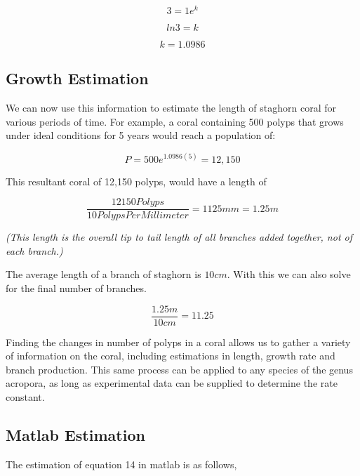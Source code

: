 \documentclass[12pt]{article}
\begin{document}
	\begin{equation}
		3=1e^{k}
	\end{equation}
	
	\begin{equation}
		ln3=k
	\end{equation}
	
	\begin{equation}
		k=1.0986
	\end{equation}
	
	\subsection{Growth Estimation}
	We can now use this information to estimate the length of staghorn coral for various periods of time.
	For example, a coral containing 500 polyps that grows under ideal conditions for 5 years would reach a population of:
	
	\begin{equation}
		P = 500e^{1.0986(5)} = 12,150
	\end{equation}
	
	This resultant coral of 12,150 polyps, would have a length of 
	
	\begin{equation}
		\frac{12150 Polyps}{10 Polyps Per Millimeter} =1125mm=1.25m
	\end{equation}
	
	\textit{(This length is the overall tip to tail length of all branches added together, not of each branch.) }
	
	The average length of a branch of staghorn is $10cm$\cite{AcroStats}. With this we can also solve for the final number of branches.
	
	\begin{equation}
		\frac{1.25m}{10cm}=11.25
	\end{equation}
	
	Finding the changes in number of polyps in a coral allows us to gather a variety of information on the coral, including estimations in length, growth rate and branch production. This same process can be applied to any species of the genus acropora, as long as experimental data can be supplied to determine the rate constant.
	
	\newpage
	
	\subsection{Matlab Estimation}
	The estimation of equation 14 in matlab is as follows,
	
\end{document}
